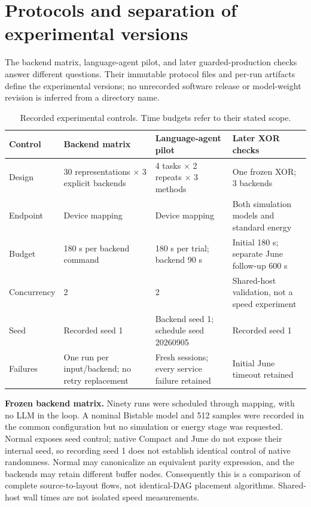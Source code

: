 \documentclass[11pt,a4paper]{article}
\begin{document}
\section{Protocols and separation of experimental versions}
The backend matrix, language-agent pilot, and later guarded-production checks answer different questions. Their immutable protocol files and per-run artifacts define the experimental versions; no unrecorded software release or model-weight revision is inferred from a directory name.

\begin{table}[H]
\centering
\caption{Recorded experimental controls. Time budgets refer to their stated scope.}
\begin{tabularx}{\linewidth}{@{}p{29mm}YYY@{}}
\toprule
Control & Backend matrix & Language-agent pilot & Later XOR checks\\
\midrule
Design & 30 representations $\times$ 3 explicit backends & 4 tasks $\times$ 2 repeats $\times$ 3 methods & One frozen XOR; 3 backends\\
Endpoint & Device mapping & Device mapping & Both simulation models and standard energy\\
Budget & 180 s per backend command & 180 s per trial; backend 90 s & Initial 180 s; separate June follow-up 600 s\\
Concurrency & 2 & 2 & Shared-host validation, not a speed experiment\\
Seed & Recorded seed 1 & Backend seed 1; schedule seed 20260905 & Recorded seed 1\\
Failures & One run per input/backend; no retry replacement & Fresh sessions; every service failure retained & Initial June timeout retained\\
\bottomrule
\end{tabularx}
\label{tab:protocols}
\end{table}

\textbf{Frozen backend matrix.} Ninety runs were scheduled through mapping, with no LLM in the loop. A nominal Bistable model and 512 samples were recorded in the common configuration but no simulation or energy stage was requested. Normal exposes seed control; native Compact and June do not expose their internal seed, so recording seed 1 does not establish identical control of native randomness. Normal may canonicalize an equivalent parity expression, and the backends may retain different buffer nodes. Consequently this is a comparison of complete source-to-layout flows, not identical-DAG placement algorithms. Shared-host wall times are not isolated speed measurements.
\end{document}
